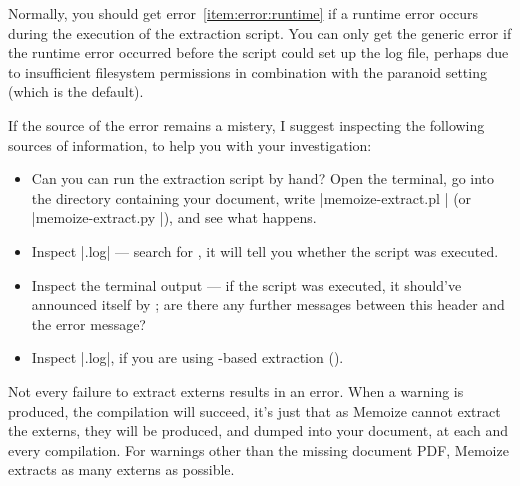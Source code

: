 \documentclass[a4paper,11pt]{article}
\begin{document}
\begin{enumerate}
  Normally, you should get error~\ref{item:error:runtime} if a runtime error
  occurs during the execution of the extraction script.  You can only get the
  generic error if the runtime error occurred before the script could set up
  the log file, perhaps due to insufficient filesystem permissions in
  combination with the paranoid  setting (which is the
  default).

  If the source of the error remains a mistery, I suggest inspecting the
  following sources of information, to help you with your investigation:
  \begin{itemize}
  \item Can you can run the extraction script by hand?  Open the terminal, go
    into the directory containing your document, write |memoize-extract.pl
    | (or |memoize-extract.py |), and
    see what happens.
  \item Inspect |.log| --- search for
    , it will tell you whether the
    script was executed.
  \item Inspect the  terminal output --- if the script was
    executed, it should've announced itself by ; are there any further messages between this header
    and the error message?
  \item Inspect |.log|, if you are using 
    -based extraction
    ().
  \end{itemize}
  
\end{enumerate}

Not every failure to extract externs results in an error.  When a warning is
produced, the compilation will succeed, it's just that as Memoize cannot
extract the externs, they will be produced, and dumped into your document, at
each and every compilation.  For warnings other than the missing document PDF,
Memoize extracts as many externs as possible.
\end{document}
